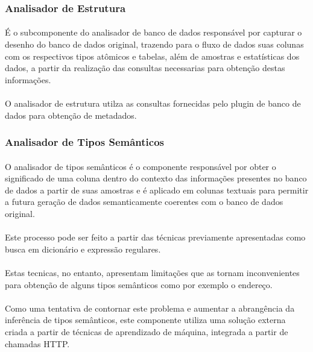 \subsubsection{Analisador de Estrutura}

\paragraph{} É o subcomponente do analisador de banco de dados responsável por capturar o desenho do banco de dados original, trazendo para o fluxo de dados suas colunas com os respectivos tipos atômicos e tabelas, além de amostras e estatísticas dos dados, a partir da realização das consultas necessarias para obtenção destas informações.

\paragraph{} O analisador de estrutura utilza as consultas fornecidas pelo plugin de banco de dados para obtenção de metadados.


\subsubsection{Analisador de Tipos Semânticos}

\paragraph{} O analisador de tipos semânticos é o componente responsável por obter o significado de uma coluna dentro do contexto das informações presentes no banco de dados a partir de suas amostras e é aplicado em colunas textuais para permitir a futura geração de dados semanticamente coerentes com o banco de dados original.

\paragraph{} Este processo pode ser feito a partir das técnicas previamente apresentadas como busca em dicionário e expressão regulares.

\paragraph{} Estas tecnicas, no entanto, apresentam limitações que as tornam inconvenientes para obtenção de alguns tipos semânticos como por exemplo o endereço.

\paragraph{} Como uma tentativa de contornar este problema e aumentar a abrangência da inferência de tipos semânticos, este componente utiliza uma solução externa criada a partir de técnicas de aprendizado de máquina, integrada a partir de chamadas HTTP.

